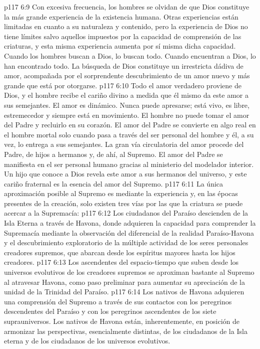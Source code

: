 \vs p117 6:9 \pc Con excesiva frecuencia, los hombres se olvidan de que Dios constituye la más grande experiencia de la existencia humana. Otras experiencias están limitadas en cuanto a su naturaleza y contenido, pero la experiencia de Dios no tiene límites salvo aquellos impuestos por la capacidad de comprensión de las criaturas, y esta misma experiencia aumenta por sí misma dicha capacidad. Cuando los hombres buscan a Dios, lo buscan todo. Cuando encuentran a Dios, lo han encontrado todo. La búsqueda de Dios constituye un irrestricta dádiva de amor, acompañada por el sorprendente descubrimiento de un amor nuevo y más grande que está por otorgarse.
\vs p117 6:10 Todo el amor verdadero proviene de Dios, y el hombre recibe el cariño divino a medida que él mismo da este amor a sus semejantes. El amor es dinámico. Nunca puede apresarse; está vivo, es libre, estremecedor y siempre está en movimiento. El hombre no puede tomar el amor del Padre y recluirlo en su corazón. El amor del Padre se convierte en algo real en el hombre mortal solo cuando pasa a través del ser personal del hombre y él, a su vez, lo entrega a sus semejantes. La gran vía circulatoria del amor procede del Padre, de hijos a hermanos y, de ahí, al Supremo. El amor del Padre se manifiesta en el ser personal humano gracias al ministerio del modelador interior. Un hijo que conoce a Dios revela este amor a sus hermanos del universo, y este cariño fraternal es la esencia del amor del Supremo.
\vs p117 6:11 \pc La única aproximación posible al Supremo es mediante la experiencia y, en las épocas presentes de la creación, solo existen tres vías por las que la criatura se puede acercar a la Supremacía:
\vs p117 6:12 Los ciudadanos del Paraíso descienden de la Isla Eterna a través de Havona, donde adquieren la capacidad para comprender la Supremacía mediante la observación del diferencial de la realidad Paraíso\hyp{}Havona y el descubrimiento exploratorio de la múltiple actividad de los seres personales creadores supremos, que abarcan desde los espíritus mayores hasta los hijos creadores.
\vs p117 6:13 Los ascendentes del espacio\hyp{}tiempo que suben desde los universos evolutivos de los creadores supremos se aproximan bastante al Supremo al atravesar Havona, como paso preliminar para aumentar su apreciación de la unidad de la Trinidad del Paraíso.
\vs p117 6:14 Los nativos de Havona adquieren una comprensión del Supremo a través de sus contactos con los peregrinos descendentes del Paraíso y con los peregrinos ascendentes de los siete suprauniversos. Los nativos de Havona están, inherentemente, en posición de armonizar las perspectivas, esencialmente distintas, de los ciudadanos de la Isla eterna y de los ciudadanos de los universos evolutivos.
